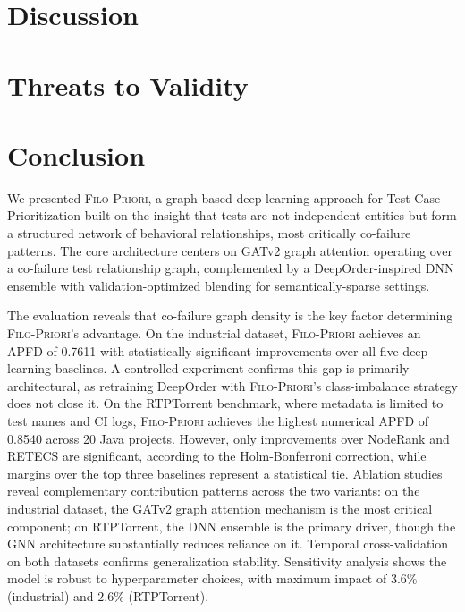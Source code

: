 \documentclass[10pt,journal,compsoc]{IEEEtran}
\newcommand{\filopriori}{\textsc{Filo-Priori}}
\begin{document}


\section{Discussion}
\label{sec:discussion}



\section{Threats to Validity}
\label{sec:threats}



\section{Conclusion}
\label{sec:conclusion}

We presented \filopriori{}, a graph-based deep learning approach for Test Case
Prioritization built on the insight that tests are not independent entities but
form a structured network of behavioral relationships, most critically
co-failure patterns. The core architecture centers on GATv2 graph attention
operating over a co-failure test relationship graph, complemented by a
DeepOrder-inspired DNN ensemble with validation-optimized blending for
semantically-sparse settings.

The evaluation reveals that co-failure graph density is the key factor
determining \filopriori{}'s advantage. On the industrial dataset,
\filopriori{} achieves an APFD of 0.7611 with statistically significant
improvements over all five deep learning baselines. A controlled experiment confirms this gap is primarily
architectural, as retraining DeepOrder with \filopriori{}'s class-imbalance
strategy does not close it. On the
RTPTorrent benchmark, where metadata is limited to test names and CI logs,
\filopriori{} achieves the highest numerical APFD of 0.8540 across 20 Java
projects. However, only improvements over NodeRank and RETECS are significant, according to the Holm-Bonferroni correction, while margins over the top three baselines
represent a statistical tie.
Ablation studies reveal complementary contribution patterns across the two
variants: on the industrial dataset, the GATv2 graph attention mechanism is
the most critical component; on RTPTorrent, the DNN
ensemble is the primary driver, though the GNN architecture substantially
reduces reliance on it.
Temporal cross-validation on both datasets confirms generalization
stability. Sensitivity analysis shows the model is robust to
hyperparameter choices, with maximum impact of 3.6\% (industrial) and 2.6\%
(RTPTorrent).
\end{document}
